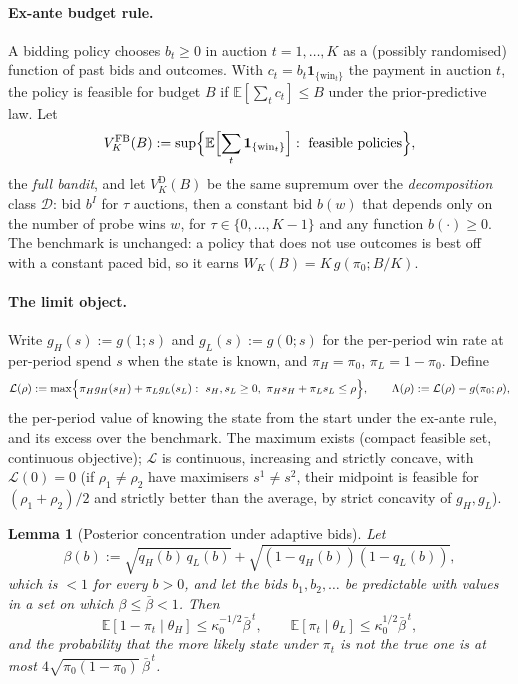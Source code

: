 \documentclass[11pt]{article}
\newtheorem{lemma}{Lemma}
\theoremstyle{definition}
\theoremstyle{remark}
\newcommand{\E}{\mathbb{E}}
\newcommand{\ind}[1]{\mathbf{1}_{#1}}
\begin{document}
\paragraph{Ex-ante budget rule.} A bidding policy chooses $b_t\ge0$ in auction $t=1,\dots,K$ as a (possibly
randomised) function of past bids and outcomes. With $c_t=b_t\ind{\{\text{win}_t\}}$ the payment in auction $t$, the
policy is feasible for budget $B$ if $\E[\sum_t c_t]\le B$ under the prior-predictive law. Let
\[
V^{\mathrm{FB}}_K(B):=\sup\Bigl\{\E\Bigl[\sum_t\ind{\{\text{win}_t\}}\Bigr]:\ \text{feasible policies}\Bigr\},
\]
the \emph{full bandit}, and let $V^{\mathrm D}_K(B)$ be the same supremum over the \emph{decomposition} class
$\mathcal D$: bid $b^I$ for $\tau$ auctions, then a constant bid $b(w)$ that depends only on the number of probe wins
$w$, for $\tau\in\{0,\dots,K-1\}$ and any function $b(\cdot)\ge0$. The benchmark is unchanged: a policy that does not
use outcomes is best off with a constant paced bid, so it earns $W_K(B)=K\,g(\pi_0;B/K)$.

\paragraph{The limit object.} Write $g_H(s):=g(1;s)$ and $g_L(s):=g(0;s)$ for the per-period win rate at per-period spend
$s$ when the state is known, and $\pi_H=\pi_0$, $\pi_L=1-\pi_0$. Define
\[
\mathcal L(\rho):=\max\Bigl\{\pi_H g_H(s_H)+\pi_L g_L(s_L):\ s_H,s_L\ge0,\ \pi_Hs_H+\pi_Ls_L\le\rho\Bigr\},
\qquad \Lambda(\rho):=\mathcal L(\rho)-g(\pi_0;\rho),
\]
the per-period value of knowing the state from the start under the ex-ante rule, and its excess over the benchmark.
The maximum exists (compact feasible set, continuous objective); $\mathcal L$ is continuous, increasing and strictly
concave, with $\mathcal L(0)=0$ (if $\rho_1\ne\rho_2$ have maximisers $s^1\ne s^2$, their midpoint is feasible for
$(\rho_1+\rho_2)/2$ and strictly better than the average, by strict concavity of $g_H,g_L$).

\begin{lemma}[Posterior concentration under adaptive bids]\label{lem:adapt}
Let
\[
\beta(b):=\sqrt{q_H(b)\,q_L(b)}+\sqrt{(1-q_H(b))(1-q_L(b))},
\]
which is $<1$ for every $b>0$, and let the bids $b_1,b_2,\dots$ be predictable with values in a set on which $\beta\le\bar\beta<1$. Then
\[
\E[1-\pi_t\mid\theta_H]\le\kappa_0^{-1/2}\bar\beta^{\,t},\qquad \E[\pi_t\mid\theta_L]\le\kappa_0^{1/2}\bar\beta^{\,t},
\]
and the probability that the more likely state under $\pi_t$ is not the true one is at most
$4\sqrt{\pi_0(1-\pi_0)}\,\bar\beta^{\,t}$.
\end{lemma}
\end{document}
